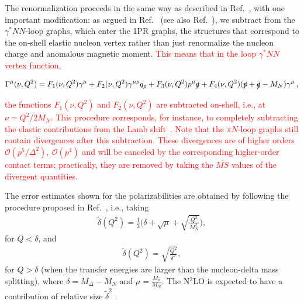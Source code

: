 \documentclass[twocolumn,prc,showpacs,nofootinbib,preprintnumbers,amsmath,amssymb,superscriptaddress]{revtex4-1}
\begin{document}
The renormalization proceeds in the same way as described in Ref.~\cite{Lensky:2009uv}, with one important modification: as argued in
Ref.~\cite{Birse:2012eb} (see also Ref.~\cite{Alarcon:2013cba}), we subtract from the $\gamma^* NN$-loop graphs, which enter the 1PR graphs,
the structures that correspond to the on-shell elastic nucleon vertex rather than just renormalize the nucleon charge and anomalous magnetic moment.
\textcolor{red}{This means that in the loop $\gamma^* NN$ vertex function,}
\begin{widetext}
\begin{equation}
\Gamma^\mu(\nu,Q^2)=F_1(\nu,Q^2)\gamma^\mu+F_2(\nu,Q^2)\gamma^{\mu\rho}q_\rho+F_3(\nu,Q^2)p^\mu\slashed{q}+F_4(\nu,Q^2)(\slashed{p}+\slashed{q}-M_N)\gamma^\mu\,,
\end{equation}
\end{widetext}
\textcolor{red}{the functions $F_1(\nu,Q^2)$ and $F_2(\nu,Q^2)$ are subtracted on-shell, i.e., at $\nu=Q^2/2M_N$. This procedure corresponds, for instance,
to completely subtracting the elastic contributions from the Lamb shift~\cite{Alarcon:2013cba}. Note that the $\pi N$-loop graphs
still contain divergences after this subtraction. These divergences are of higher orders $\mathcal{O}(p^5/\varDelta^2),\ \mathcal{O}(p^4)$
and will be canceled by the corresponding higher-order
contact terms; practically, they are removed by taking the $\overline{MS}$ values of the divergent quantities.}

The error estimates shown for the polarizabilities are obtained by following the procedure proposed in Ref.~\cite{Pascalutsa:2005vq}, i.e., taking
\begin{align}
  \tilde{\delta}(Q^2) = \frac{1}{3} \Big(\delta +\sqrt{\mu} + \sqrt{\frac{Q^2}{M_N^2}}\Big),
\end{align}
for $Q< \delta$, and
\begin{align}
  \tilde{\delta}(Q^2) = \sqrt{\frac{Q^2}{\delta^2}},
\end{align}
for $Q>\delta$ (when the transfer energies are larger than the nucleon-delta mass splitting), where  $\delta = M_\Delta - M_N$ and $\mu = \frac{M_\pi}{M_N}$.
The N$^2$LO is expected to have a contribution of relative size $\tilde{\delta}^2$ \cite{Pascalutsa:2005vq}.

\end{document}

